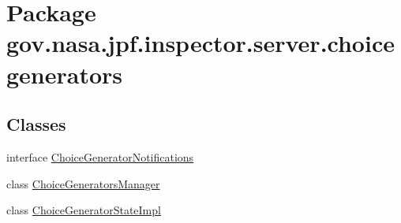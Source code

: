 \hypertarget{namespacegov_1_1nasa_1_1jpf_1_1inspector_1_1server_1_1choicegenerators}{}\section{Package gov.\+nasa.\+jpf.\+inspector.\+server.\+choicegenerators}
\label{namespacegov_1_1nasa_1_1jpf_1_1inspector_1_1server_1_1choicegenerators}
\subsection*{Classes}
\begin{DoxyCompactItemize}
\item 
interface \hyperlink{interfacegov_1_1nasa_1_1jpf_1_1inspector_1_1server_1_1choicegenerators_1_1_choice_generator_notifications}{Choice\+Generator\+Notifications}
\item 
class \hyperlink{classgov_1_1nasa_1_1jpf_1_1inspector_1_1server_1_1choicegenerators_1_1_choice_generators_manager}{Choice\+Generators\+Manager}
\item 
class \hyperlink{classgov_1_1nasa_1_1jpf_1_1inspector_1_1server_1_1choicegenerators_1_1_choice_generator_state_impl}{Choice\+Generator\+State\+Impl}
\end{DoxyCompactItemize}
